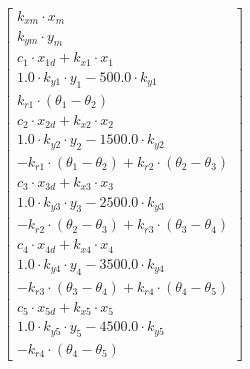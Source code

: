$$\left[\begin{matrix}k_{xm} \cdot x_{m}\\k_{ym} \cdot y_{m}\\c_{1} \cdot x_{1 d} + k_{x1} \cdot x_{1}\\1.0 \cdot k_{y1} \cdot y_{1} - 500.0 \cdot k_{y1}\\k_{r1} \cdot \left(\theta_{1} - \theta_{2}\right)\\c_{2} \cdot x_{2 d} + k_{x2} \cdot x_{2}\\1.0 \cdot k_{y2} \cdot y_{2} - 1500.0 \cdot k_{y2}\\- k_{r1} \cdot \left(\theta_{1} - \theta_{2}\right) + k_{r2} \cdot \left(\theta_{2} - \theta_{3}\right)\\c_{3} \cdot x_{3 d} + k_{x3} \cdot x_{3}\\1.0 \cdot k_{y3} \cdot y_{3} - 2500.0 \cdot k_{y3}\\- k_{r2} \cdot \left(\theta_{2} - \theta_{3}\right) + k_{r3} \cdot \left(\theta_{3} - \theta_{4}\right)\\c_{4} \cdot x_{4 d} + k_{x4} \cdot x_{4}\\1.0 \cdot k_{y4} \cdot y_{4} - 3500.0 \cdot k_{y4}\\- k_{r3} \cdot \left(\theta_{3} - \theta_{4}\right) + k_{r4} \cdot \left(\theta_{4} - \theta_{5}\right)\\c_{5} \cdot x_{5 d} + k_{x5} \cdot x_{5}\\1.0 \cdot k_{y5} \cdot y_{5} - 4500.0 \cdot k_{y5}\\- k_{r4} \cdot \left(\theta_{4} - \theta_{5}\right)\end{matrix}\right]$$


